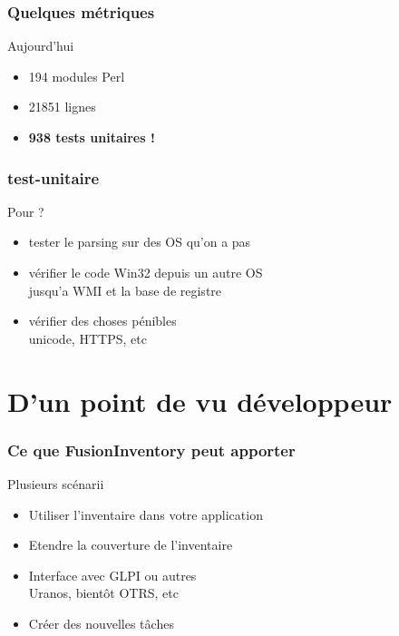 \documentclass{beamer}
\begin{document}
\begin{frame}
    \frametitle{Quelques métriques}

    \begin{block}{Aujourd'hui}
        \begin{itemize}
            \item 194 modules Perl
            \item 21851 lignes
            \item \bf{938 tests unitaires} !
        \end{itemize}
    \end{block}

\end{frame}

\begin{frame}
    \frametitle{test-unitaire}

    \begin{block}{Pour ?}
        \begin{itemize}
            \item tester le parsing sur des OS qu'on a pas
            \item vérifier le code Win32 depuis un autre OS \\
            \small{jusqu'a WMI et la base de registre}
            \item vérifier des choses pénibles \\
            \small{unicode, HTTPS, etc}
        \end{itemize}
    \end{block}

\end{frame}

\section{D'un point de vu développeur}

\begin{frame}
    \frametitle{Ce que FusionInventory peut apporter}

    \begin{block}{Plusieurs scénarii}
        \begin{itemize}
            \item Utiliser l'inventaire dans votre application
            \item Etendre la couverture de l'inventaire
            \item Interface avec GLPI ou autres \\
            \small{Uranos, bientôt OTRS, etc}
            \item Créer des nouvelles tâches
        \end{itemize}
    \end{block}

\end{frame}
\end{document}
